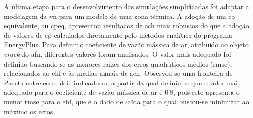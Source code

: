 \documentclass[brazil,hardcopy,openany]{ufscthesis} %
\begin{document}
	A última etapa para o desenvolvimento das simulações simplificadas foi adaptar a modelagem da \acrshort{vn} para um modelo de uma zona térmica.
	A adoção de um \acrshort{cp} equivalente, ou \acrshort{cpeq}, apresentou resultados de \acrlong{ach} mais robustos do que a adoção de valores de \acrshort{cp} calculados diretamente pelo métodos analítico do programa EnergyPlus. 
	Para definir o coeficiente de vazão mássica de ar, atribuído ao objeto \textit{crack} do \acrfull{afn}, diferentes valores foram analisados.
	O valor mais adequado foi definido buscando-se as menores raízes dos erros quadráticos médios (\acrshort{rmse}), relacionados ao \acrshort{ehf} e às médias anuais de \acrfull{ach}. 
	Observou-se uma fronteira de Pareto entre esses dois indicadores, a partir da qual definiu-se que o valor mais adequado para o coeficiente de vazão mássica de ar é 0,8, pois este apresenta o menor \acrshort{rmse} para o \acrshort{ehf}, que é o dado de saída para o qual buscou-se minimizar ao máximo os erros.
	
	
\end{document}
